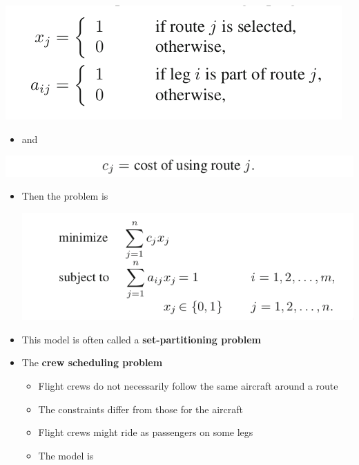 \documentclass[11pt]{article}
\begin{document}
\begin{center}
\includegraphics[width=.9\linewidth]{Integer Programming/screenshot_2019-02-17_09-23-44.png}
\end{center}
\begin{itemize}
\item and
\end{itemize}
\begin{center}
\includegraphics[width=.9\linewidth]{Integer Programming/screenshot_2019-02-17_09-24-19.png}
\end{center}
\begin{itemize}
\item Then the problem is
\begin{center}
\includegraphics[width=.9\linewidth]{Integer Programming/screenshot_2019-02-17_09-24-46.png}
\end{center}
\item This model is often called a \textbf{set-partitioning problem}

\item The \textbf{crew scheduling problem}
\begin{itemize}
\item Flight crews do not necessarily follow the same aircraft around a route
\item The constraints differ from those for the aircraft
\item Flight crews might ride as passengers on some legs
\item The model is
\end{itemize}
\end{itemize}
\end{document}
